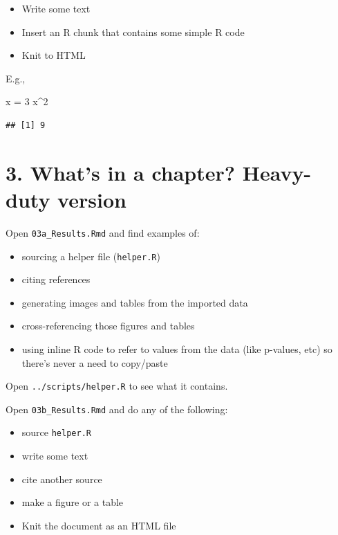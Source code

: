 \documentclass[
  12pt,
  oneside]{book}
\newenvironment{Shaded}{\begin{snugshade}}{\end{snugshade}}
\newcommand{\DecValTok}[1]{\textcolor[rgb]{0.00,0.00,0.81}{#1}}
\newcommand{\NormalTok}[1]{#1}
\newcommand{\OperatorTok}[1]{\textcolor[rgb]{0.81,0.36,0.00}{\textbf{#1}}}
\newcommand{\StringTok}[1]{\textcolor[rgb]{0.31,0.60,0.02}{#1}}
\providecommand{\tightlist}{%
  \setlength{\itemsep}{0pt}\setlength{\parskip}{0pt}}
\numberwithin{figure}{chapter}
\begin{document}
\begin{itemize}
\tightlist
\item
  Write some text
\item
  Insert an R chunk that contains some simple R code
\item
  Knit to HTML
\end{itemize}

E.g.,

\begin{Shaded}
\begin{Highlighting}[]
\NormalTok{x =}\StringTok{ }\DecValTok{3}
\NormalTok{x}\OperatorTok{^}\DecValTok{2}
\end{Highlighting}
\end{Shaded}

\begin{verbatim}
## [1] 9
\end{verbatim}

\hypertarget{ex3}{%
\section{3. What's in a chapter? Heavy-duty version}\label{ex3}}

Open \texttt{03a\_Results.Rmd} and find examples of:

\begin{itemize}
\tightlist
\item
  sourcing a helper file (\texttt{helper.R})
\item
  citing references
\item
  generating images and tables from the imported data
\item
  cross-referencing those figures and tables
\item
  using inline R code to refer to values from the data (like p-values, etc) so there's never a need to copy/paste
\end{itemize}

Open \texttt{../scripts/helper.R} to see what it contains.

Open \texttt{03b\_Results.Rmd} and do any of the following:

\begin{itemize}
\tightlist
\item
  source \texttt{helper.R}
\item
  write some text
\item
  cite another source
\item
  make a figure or a table
\item
  Knit the document as an HTML file
\end{itemize}
\end{document}
